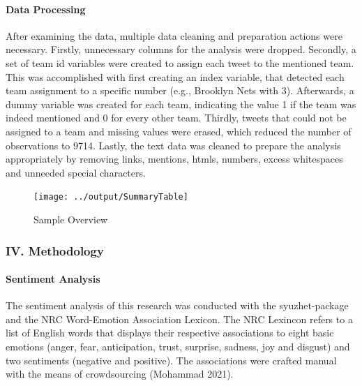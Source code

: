 \documentclass[
]{article}
\begin{document}
\hfill\break

\hypertarget{data-processing}{%
\paragraph{Data Processing}\label{data-processing}}

After examining the data, multiple data cleaning and preparation actions
were necessary. Firstly, unnecessary columns for the analysis were
dropped. Secondly, a set of team id variables were created to assign
each tweet to the mentioned team. This was accomplished with first
creating an index variable, that detected each team assignment to a
specific number (e.g., Brooklyn Nets with 3). Afterwards, a dummy
variable was created for each team, indicating the value 1 if the team
was indeed mentioned and 0 for every other team. Thirdly, tweets that
could not be assigned to a team and missing values were erased, which
reduced the number of observations to 9714. Lastly, the text data was
cleaned to prepare the analysis appropriately by removing links,
mentions, htmls, numbers, excess whitespaces and unneeded special
characters.

\begin{figure}

{\centering \texttt{[image: ../output/SummaryTable]} 

}

\caption{Sample Overview}\label{fig:unnamed-chunk-5}
\end{figure}

\hfill\break

\hypertarget{iv.-methodology}{%
\subsubsection{IV. Methodology}\label{iv.-methodology}}

\hypertarget{sentiment-analysis}{%
\paragraph{Sentiment Analysis}\label{sentiment-analysis}}

The sentiment analysis of this research was conducted with the
syuzhet-package and the NRC Word-Emotion Association Lexicon. The NRC
Lexincon refers to a list of English words that displays their
respective associations to eight basic emotions (anger, fear,
anticipation, trust, surprise, sadness, joy and disgust) and two
sentiments (negative and positive). The associations were crafted manual
with the means of crowdsourcing (Mohammad 2021).
\end{document}
